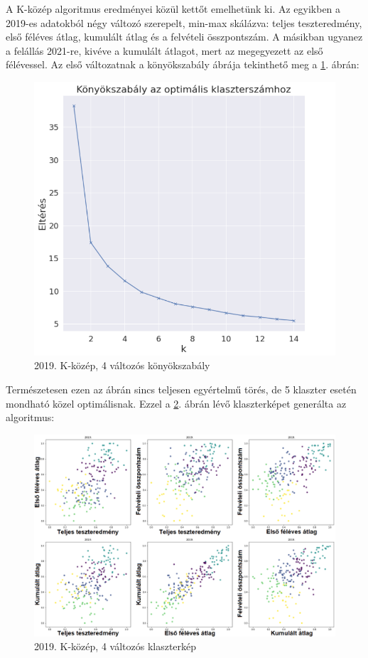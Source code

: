 \documentclass[12pt]{article}
\begin{document}
A K-közép algoritmus eredményei közül kettőt emelhetünk ki. Az egyikben a 2019-es adatokból négy változó szerepelt, min-max skálázva: teljes teszteredmény, első féléves átlag, kumulált átlag és a felvételi összpontszám. A másikban ugyanez a felállás 2021-re, kivéve a kumulált átlagot, mert az megegyezett az első félévessel. Az első változatnak a könyökszabály ábrája tekinthető meg a \ref{fig:2019_kmeans_best_konyok}. ábrán:

\begin{figure}[H]
\centering
\includegraphics[scale = 0.48]{kepek/kmeans_konyok.png}
\caption{2019. K-közép, 4 változós könyökszabály}
\label{fig:2019_kmeans_best_konyok}
\end{figure}

Természetesen ezen az ábrán  sincs teljesen egyértelmű törés, de 5 klaszter esetén mondható közel optimálisnak. Ezzel a \ref{fig:2019_kmeans_5}. ábrán lévő klaszterképet generálta az algoritmus:

\begin{figure}[H]
\centering
\includegraphics[scale= 0.48]{kepek/2019_kmeans_5.png}
\caption{2019. K-közép, 4 változós klaszterkép}
\label{fig:2019_kmeans_5}
\end{figure}
\end{document}
